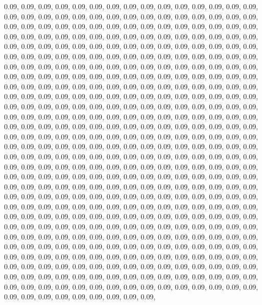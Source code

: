 \documentclass[11pt,]{article}
\begin{document}
0.09, 0.09, 0.09, 0.09, 0.09, 0.09, 0.09, 0.09, 0.09, 0.09, 0.09, 0.09,
0.09, 0.09, 0.09, 0.09, 0.09, 0.09, 0.09, 0.09, 0.09, 0.09, 0.09, 0.09,
0.09, 0.09, 0.09, 0.09, 0.09, 0.09, 0.09, 0.09, 0.09, 0.09, 0.09, 0.09,
0.09, 0.09, 0.09, 0.09, 0.09, 0.09, 0.09, 0.09, 0.09, 0.09, 0.09, 0.09,
0.09, 0.09, 0.09, 0.09, 0.09, 0.09, 0.09, 0.09, 0.09, 0.09, 0.09, 0.09,
0.09, 0.09, 0.09, 0.09, 0.09, 0.09, 0.09, 0.09, 0.09, 0.09, 0.09, 0.09,
0.09, 0.09, 0.09, 0.09, 0.09, 0.09, 0.09, 0.09, 0.09, 0.09, 0.09, 0.09,
0.09, 0.09, 0.09, 0.09, 0.09, 0.09, 0.09, 0.09, 0.09, 0.09, 0.09, 0.09,
0.09, 0.09, 0.09, 0.09, 0.09, 0.09, 0.09, 0.09, 0.09, 0.09, 0.09, 0.09,
0.09, 0.09, 0.09, 0.09, 0.09, 0.09, 0.09, 0.09, 0.09, 0.09, 0.09, 0.09,
0.09, 0.09, 0.09, 0.09, 0.09, 0.09, 0.09, 0.09, 0.09, 0.09, 0.09, 0.09,
0.09, 0.09, 0.09, 0.09, 0.09, 0.09, 0.09, 0.09, 0.09, 0.09, 0.09, 0.09,
0.09, 0.09, 0.09, 0.09, 0.09, 0.09, 0.09, 0.09, 0.09, 0.09, 0.09, 0.09,
0.09, 0.09, 0.09, 0.09, 0.09, 0.09, 0.09, 0.09, 0.09, 0.09, 0.09, 0.09,
0.09, 0.09, 0.09, 0.09, 0.09, 0.09, 0.09, 0.09, 0.09, 0.09, 0.09, 0.09,
0.09, 0.09, 0.09, 0.09, 0.09, 0.09, 0.09, 0.09, 0.09, 0.09, 0.09, 0.09,
0.09, 0.09, 0.09, 0.09, 0.09, 0.09, 0.09, 0.09, 0.09, 0.09, 0.09, 0.09,
0.09, 0.09, 0.09, 0.09, 0.09, 0.09, 0.09, 0.09, 0.09, 0.09, 0.09, 0.09,
0.09, 0.09, 0.09, 0.09, 0.09, 0.09, 0.09, 0.09, 0.09, 0.09, 0.09, 0.09,
0.09, 0.09, 0.09, 0.09, 0.09, 0.09, 0.09, 0.09, 0.09, 0.09, 0.09, 0.09,
0.09, 0.09, 0.09, 0.09, 0.09, 0.09, 0.09, 0.09, 0.09, 0.09, 0.09, 0.09,
0.09, 0.09, 0.09, 0.09, 0.09, 0.09, 0.09, 0.09, 0.09, 0.09, 0.09, 0.09,
0.09, 0.09, 0.09, 0.09, 0.09, 0.09, 0.09, 0.09, 0.09, 0.09, 0.09, 0.09,
0.09, 0.09, 0.09, 0.09, 0.09, 0.09, 0.09, 0.09, 0.09, 0.09, 0.09, 0.09,
0.09, 0.09, 0.09, 0.09, 0.09, 0.09, 0.09, 0.09, 0.09, 0.09, 0.09, 0.09,
0.09, 0.09, 0.09, 0.09, 0.09, 0.09, 0.09, 0.09, 0.09, 0.09, 0.09, 0.09,
0.09, 0.09, 0.09, 0.09, 0.09, 0.09, 0.09, 0.09, 0.09, 0.09, 0.09, 0.09,
0.09, 0.09, 0.09, 0.09, 0.09, 0.09, 0.09, 0.09, 0.09, 0.09, 0.09, 0.09,
0.09, 0.09, 0.09, 0.09, 0.09, 0.09, 0.09, 0.09, 0.09, 0.09, 0.09, 0.09,
0.09, 0.09, 0.09, 0.09, 0.09, 0.09, 0.09, 0.09, 0.09, 0.09, 0.09, 0.09,
0.09, 0.09, 0.09, 0.09, 0.09, 0.09, 0.09, 0.09, 0.09, 0.09, 0.09, 0.09,
0.09, 0.09, 0.09, 0.09, 0.09, 0.09, 0.09, 0.09, 0.09, 0.09, 0.09, 0.09,
0.09, 0.09, 0.09, 0.09, 0.09, 0.09, 0.09, 0.09, 0.09, 0.09, 0.09, 0.09,
0.09, 0.09, 0.09, 0.09, 0.09, 0.09, 0.09, 0.09, 0.09, 0.09, 0.09, 0.09,
0.09, 0.09, 0.09, 0.09, 0.09, 0.09, 0.09, 0.09, 0.09, 0.09, 0.09, 0.09,
0.09, 0.09, 0.09, 0.09, 0.09, 0.09, 0.09, 0.09, 0.09, 0.09, 0.09, 0.09,
0.09, 0.09, 0.09, 0.09, 0.09, 0.09, 0.09, 0.09, 0.09, 0.09, 0.09, 0.09,
\end{document}
